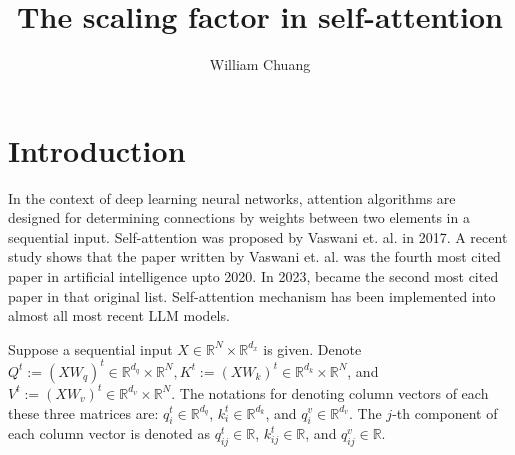 \documentclass{article}
\theoremstyle{plain}
\theoremstyle{plain} %
\theoremstyle{definition}  %
\theoremstyle{remark}  %
\theoremstyle{plain}
\begin{document}
\title{The scaling factor in self-attention}

\author{William Chuang}

\maketitle


\section{Introduction}


In the context of deep learning neural networks, attention algorithms are designed for determining connections by weights between two elements in a sequential input. Self-attention was proposed by Vaswani et. al.\cite{vaswani2017attention} in 2017. A recent study\cite{crew2020google} shows that the paper written by Vaswani et. al.\cite{vaswani2017attention} was the fourth most cited paper in artificial intelligence upto 2020. In 2023, \cite{vaswani2017attention} became the second most cited paper in that original list. Self-attention mechanism has been implemented into almost all most recent LLM models. 


Suppose a sequential input $X\in \mathbb{R}^N\times \mathbb{R}^{d_x}$ is given. Denote $Q^t:=(XW_q)^t\in \mathbb{R}^{d_q}\times\mathbb{R}^{N}, K^t:=(XW_k)^t\in \mathbb{R}^{d_k}\times\mathbb{R}^{N}$, and $V^t:=(XW_v)^t\in \mathbb{R}^{d_v}\times\mathbb{R}^{N}$. The notations for denoting column vectors of each these three matrices are: $q^t_i\in \mathbb{R}^{d_q}$, $k^t_i\in \mathbb{R}^{d_k}$, and $q^v_i\in \mathbb{R}^{d_v}$. The $j$-th component of each column vector is denoted as $q^t_{ij}\in \mathbb{R}$, $k^t_{ij}\in \mathbb{R}$, and $q^v_{ij}\in \mathbb{R}$.
\end{document}
